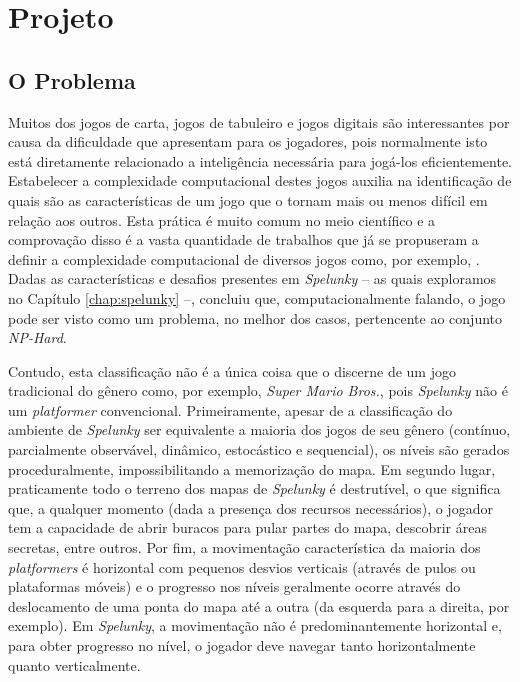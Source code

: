 \chapter{\label{chap:project}Projeto}


\section{\label{section:problem}O Problema}
Muitos dos jogos de carta, jogos de tabuleiro e jogos digitais são interessantes
por causa da dificuldade que apresentam para os jogadores, pois normalmente isto
está diretamente relacionado a inteligência necessária para jogá-los
eficientemente.  Estabelecer a complexidade computacional destes jogos auxilia
na identificação de quais são as características de um jogo que o tornam mais ou
menos difícil em relação aos outros. Esta prática é muito comum no meio
científico e a comprovação disso é a vasta quantidade de trabalhos que já se
propuseram a definir a complexidade computacional de diversos jogos como, por
exemplo, \cite{classic_nintendo_games_hard, playing_games_algorithms,
computational_complexity_platformers}. Dadas as características e desafios
presentes em \textit{Spelunky} -- as quais exploramos no Capítulo
\ref{chap:spelunky} --, \cite{SPELUNKYHARD} concluiu que, computacionalmente
falando, o jogo pode ser visto como um problema, no melhor dos casos,
pertencente ao conjunto \textit{NP-Hard}.

Contudo, esta classificação não é a única coisa que o discerne de um jogo
tradicional do gênero como, por exemplo, \textit{Super Mario Bros.}, pois
\textit{Spelunky} não é um \textit{platformer} convencional. Primeiramente,
apesar de a classificação do ambiente de \textit{Spelunky} ser equivalente a
maioria dos jogos de seu gênero (contínuo, parcialmente observável, dinâmico,
estocástico e sequencial), os níveis são gerados proceduralmente,
impossibilitando a memorização do mapa. Em segundo lugar, praticamente todo o
terreno dos mapas de \textit{Spelunky} é destrutível, o que significa que, a
qualquer momento (dada a presença dos recursos necessários), o jogador tem a
capacidade de abrir buracos para pular partes do mapa, descobrir áreas secretas,
entre outros. Por fim, a movimentação característica da maioria dos
\textit{platformers} é horizontal com pequenos desvios verticais (através de
pulos ou plataformas móveis) e o progresso nos níveis geralmente ocorre através
do deslocamento de uma ponta do mapa até a outra (da esquerda para a direita,
por exemplo). Em \textit{Spelunky}, a movimentação não é predominantemente
horizontal e, para obter progresso no nível, o jogador deve navegar tanto
horizontalmente quanto verticalmente.

